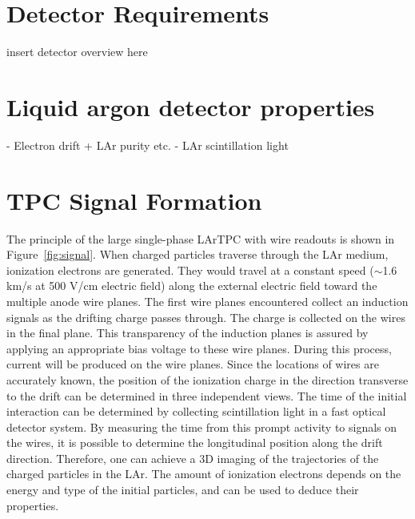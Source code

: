 
\section{Detector Requirements}

insert detector overview here 

\section{Liquid argon detector properties}
- Electron drift + LAr purity etc.
- LAr scintillation light 

\section{TPC Signal Formation}\label{sec:tpc_signal_formation}

The principle of the large single-phase LArTPC with wire readouts is shown in 
Figure~\ref{fig:signal}. When charged particles traverse through the LAr medium,
ionization electrons are generated. They would travel at a constant speed 
($\sim$1.6 km/s at 500 V/cm electric field) along the external electric field 
toward the multiple anode wire planes. The first wire planes encountered collect 
an induction signals as the drifting charge passes through.  The charge is collected 
on the wires in the final plane. This transparency of the induction planes is assured by 
applying an appropriate bias voltage to these wire planes. During this process, 
current will be produced on the wire planes. Since the locations of wires are 
accurately known, the position of the ionization charge in the direction 
transverse to the drift can be determined in three independent views. The time 
of the initial interaction can be determined by collecting scintillation light 
in a fast optical detector system. By measuring the time from this prompt activity 
to signals on the wires, it is possible to determine the longitudinal position 
along the drift direction. Therefore, one can achieve a 3D imaging of the trajectories 
of the charged particles in the LAr. The amount of ionization electrons depends on 
the energy and type of the initial particles, and can be used to deduce their properties.

